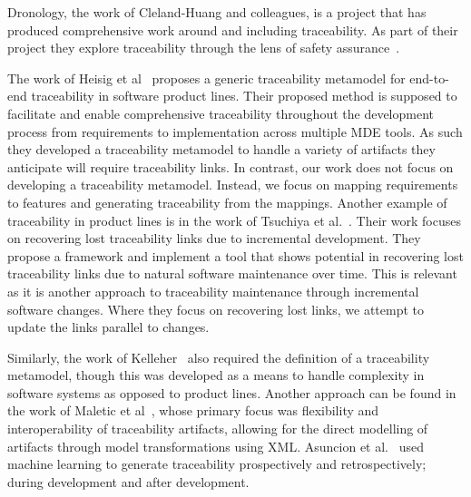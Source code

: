Dronology, the work of Cleland-Huang and colleagues, is a project that has produced comprehensive work around and including traceability. As part of their project they explore traceability through the lens of safety assurance~\cite{Cleland-HuangBCSR07, AgrawalC23, DBLP:conf/splc/Cleland-HuangAI20, mirakhorli2011tracing}.


The work of Heisig et al~\cite{heisig2019generic} proposes a generic traceability metamodel for end-to-end traceability in software product lines. Their proposed method is supposed to facilitate and enable comprehensive traceability throughout the development process from requirements to implementation across multiple MDE tools. As such they developed a traceability metamodel to handle a variety of artifacts they anticipate will require traceability links. In contrast, our work does not focus on developing a traceability metamodel. Instead, we focus on mapping requirements to features and generating traceability from the mappings. Another example of traceability in product lines is in the work of Tsuchiya et al.~\cite{tsuchiya2013recovering}. Their work focuses on recovering lost traceability links due to incremental development. They propose a framework and implement a tool that shows potential in recovering lost traceability links due to natural software maintenance over time. This is relevant as it is another approach to traceability maintenance through incremental software changes. Where they focus on recovering lost links, we attempt to update the links parallel to changes.


Similarly, the work of Kelleher~\cite{kelleher2005reusable} also required the definition of a traceability metamodel, though this was developed as a means to handle complexity in software systems as opposed to product lines. Another approach can be found in the work of Maletic et al~\cite{maletic2005xml}, whose primary focus was flexibility and interoperability of traceability artifacts, allowing for the direct modelling of artifacts through model transformations using XML. Asuncion et al.~\cite{asuncion2010software} used machine learning to generate traceability prospectively and retrospectively; during development and after development.


